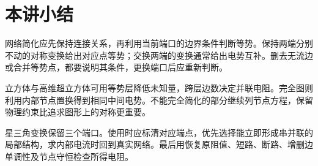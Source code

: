 \section{本讲小结}

网络简化应先保持连接关系，再利用当前端口的边界条件判断等势。保持两端分别不动的对称变换给出对应点等势；交换两端的变换通常给出电势互补。删去无流边或合并等势点，都要说明其条件，更换端口后应重新判断。

立方体与高维超立方体可用等势层降低未知量，跨层边数决定并联电阻。完全图则利用内部节点置换得到相同中间电势。不能完全简化的部分继续列节点方程，保留物理约束比追求图形上的对称更重要。

星三角变换保留三个端口。使用时应标清对应端点，优先选择能立即形成串并联的局部结构，求内部电流时回到真实网络。最后用恢复原阻值、短路、断路、增删边单调性及节点守恒检查所得电阻。

